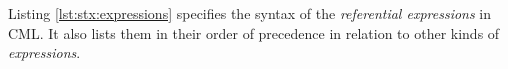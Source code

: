 Listing \ref{lst:stx:expressions} specifies the syntax of
the \emph{referential expressions} in CML.
It also lists them in their order of precedence
in relation to other kinds of \emph{expressions}.
